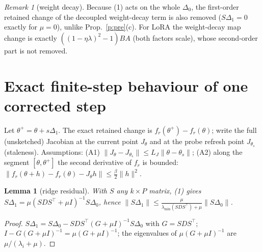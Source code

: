 \documentclass[11pt]{article}
\newtheorem{lemma}[proposition]{Lemma}
\theoremstyle{remark}
\newtheorem{remark}[proposition]{Remark}
\begin{document}
\begin{remark}[weight decay] Because (1) acts on the whole $\Delta_0$, the first-order retained change of the decoupled
weight-decay term is also removed ($S\Delta_1=0$ exactly for $\mu=0$), unlike Prop.~\ref{p:pre}(c). For LoRA the
weight-decay map change is exactly $((1-\eta\lambda)^2-1)BA$ (both factors scale), whose second-order part is not removed.
\end{remark}

\section{Exact finite-step behaviour of one corrected step}
Let $\theta^+=\theta+s\Delta_1$. The exact retained change is $f_r(\theta^+)-f_r(\theta)$; write the full (unsketched)
Jacobian at the current point $J_\theta$ and at the probe refresh point $J_{\theta_s}$ (staleness).
Assumptions: (A1) $\|J_\theta-J_{\theta_s}\|\le L_J\|\theta-\theta_s\|$; (A2) along the segment $[\theta,\theta^+]$ the
second derivative of $f_r$ is bounded: $\|f_r(\theta+h)-f_r(\theta)-J_\theta h\|\le\frac{\beta}{2}\|h\|^2$.

\begin{lemma}[ridge residual]\label{l:ridge}
With $S$ any $k\times P$ matrix, (1) gives $S\Delta_1=\mu(SDS^\top+\mu I)^{-1}S\Delta_0$, hence
$\|S\Delta_1\|\le\frac{\mu}{\lambda_{\min}(SDS^\top)+\mu}\|S\Delta_0\|$.
\end{lemma}
\begin{proof} $S\Delta_1=S\Delta_0-SDS^\top(G+\mu I)^{-1}S\Delta_0$ with $G=SDS^\top$; $I-G(G+\mu I)^{-1}=\mu(G+\mu I)^{-1}$;
the eigenvalues of $\mu(G+\mu I)^{-1}$ are $\mu/(\lambda_i+\mu)$. \end{proof}
\end{document}
